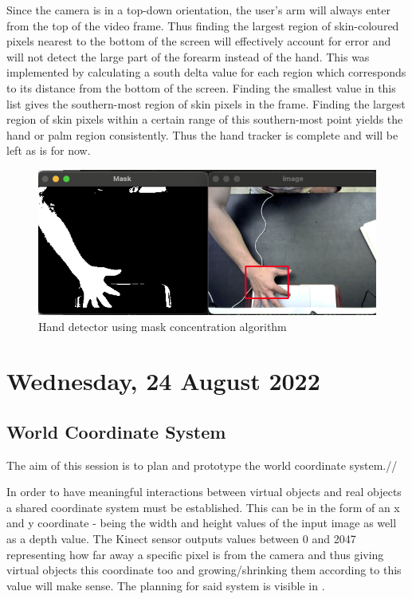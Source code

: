 Since the camera is in a top-down orientation, the user's arm will always enter from the top of the video frame. Thus finding the largest region of skin-coloured pixels nearest to the bottom of the screen will effectively account for error and will not detect the large part of the forearm instead of the hand. This was implemented by calculating a south delta value for each region which corresponds to its distance from the bottom of the screen. Finding the smallest value in this list gives the southern-most region of skin pixels in the frame. Finding the largest region of skin pixels within a certain range of this southern-most point yields the hand or palm region consistently. Thus the hand tracker is complete and will be left as is for now.

\begin{figure}[h]
    \centering
    \includegraphics[width=0.7\linewidth]{figures/hand_detection_first_principles.png}
    \caption{Hand detector using mask concentration algorithm}
    \label{fig:hand_detection_first_principles}
\end{figure}

\section[2022/08/24]{Wednesday, 24 August 2022}

\subsection{World Coordinate System}

The aim of this session is to plan and prototype the world coordinate system.//

In order to have meaningful interactions between virtual objects and real objects a shared coordinate system must be established. This can be in the form of an x and y coordinate - being the width and height values of the input image as well as a depth value. The Kinect sensor outputs values between 0 and 2047 representing how far away a specific pixel is from the camera and thus giving virtual objects this coordinate too and growing/shrinking them according to this value will make sense. The planning for said system is visible in .

